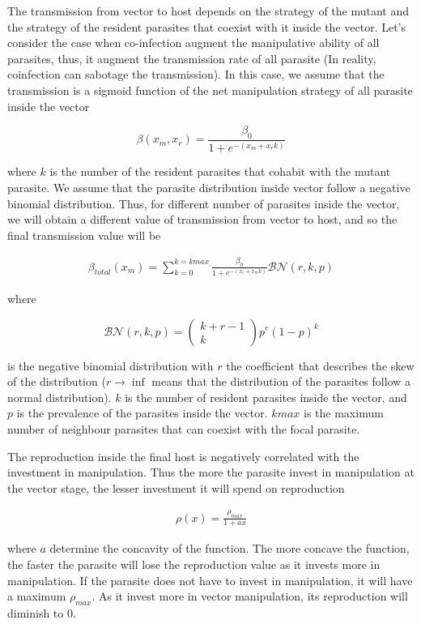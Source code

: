 \documentclass{article}
\begin{document}
The transmission from vector to host depends on the strategy of the mutant and the strategy of the resident parasites that coexist with it inside the vector. Let's consider the case when co-infection augment the manipulative ability of all parasites, thus, it augment the transmission rate of all parasite (In reality, coinfection can sabotage the transmission). In this case, we assume that the transmission is a sigmoid function of the net manipulation strategy of all parasite inside the vector

$$\beta(x_m, x_r) = \frac{\beta_0}{1 + e^{-(x_m + x_r k)}}$$

where $k$ is the number of the resident parasites that cohabit with the mutant parasite. We assume that the parasite distribution inside vector follow a negative binomial distribution. Thus, for different number of parasites inside the vector, we will obtain a different value of transmission from vector to host, and so the final transmission value will be

\begin{align*}
    \beta_{total}(x_m) = \sum_{k = 0}^{k = kmax} \frac{\beta_0}{1 + e^{-(x_r + x_m  k)}} \mathcal{BN}(r, k, p)
\end{align*}

where 

$$\mathcal{BN}(r, k, p)
= \begin{pmatrix} k + r - 1 \\ k\end{pmatrix}p^r (1 -p)^k$$

is the negative binomial distribution with $r$ the coefficient that describes the skew of the distribution ($r \rightarrow \inf$ means that the distribution of the parasites follow a normal distribution). $k$ is the number of resident parasites inside the vector, and $p$ is the prevalence of the parasites inside the vector. $kmax$ is the maximum number of neighbour parasites that can coexist with the focal parasite.

The reproduction inside the final host is negatively correlated with the investment in manipulation. Thus the more the parasite invest in manipulation at the vector stage, the lesser investment it will spend on reproduction 

\begin{align*}
    \rho(x) = \frac{\rho_{max}}{1 + a x}
\end{align*}

where $a$ determine the concavity of the function. The more concave the function, the faster the parasite will lose the reproduction value as it invests more in manipulation. If the parasite does not have to invest in manipulation, it will have a maximum $\rho_{max}$. As it invest more in vector manipulation, its reproduction will diminish to 0.
\end{document}
